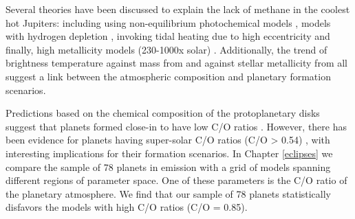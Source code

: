 Several theories have been discussed to explain the lack of methane in the coolest hot Jupiters: including using non-equilibrium photochemical models \citep{Line2011}, models with hydrogen depletion \citep{Hu2015}, invoking tidal heating due to high eccentricity \citep{Agundez2014} and finally, high metallicity models (230-1000x solar) \citep{Moses2013b}. Additionally, the trend of brightness temperature against mass from \citet{Kammer2015} and against stellar metallicity from \citet{Wallack2017} all suggest a link between the atmospheric composition and planetary formation scenarios.

Predictions based on the chemical composition of the protoplanetary disks suggest that planets formed close-in to have low C/O ratios \citep[e.g.,][]{Oberg2011,Eistrup2018}. However, there has been evidence for planets having super-solar C/O ratios (C/O > 0.54) \citep[e.g.,][]{Lodders2004,Madhusudhan2011}, with interesting implications for their formation scenarios. In Chapter \ref{eclipses} we compare the sample of 78 planets in emission with a grid of models spanning different regions of parameter space. One of these parameters is the C/O ratio of the planetary atmosphere. We find that our sample of 78 planets statistically disfavors the models with high C/O ratios (C/O = 0.85).



